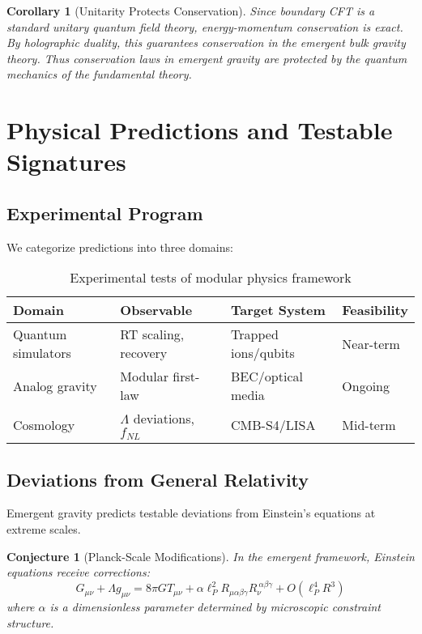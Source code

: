 \documentclass[11pt,a4paper]{article}
\newtheorem{corollary}[theorem]{Corollary}
\newtheorem{conjecture}{Conjecture}[section]
\theoremstyle{remark}
\theoremstyle{definition}
\begin{document}
\begin{corollary}[Unitarity Protects Conservation]
Since boundary CFT is a standard unitary quantum field theory, energy-momentum conservation is exact. By holographic duality, this guarantees conservation in the emergent bulk gravity theory. Thus conservation laws in emergent gravity are protected by the quantum mechanics of the fundamental theory.
\end{corollary}

\section{Physical Predictions and Testable Signatures}
\label{sec:physical_predictions}

\subsection{Experimental Program}

We categorize predictions into three domains:

\begin{table}[h]
\centering
\begin{tabular}{|l|l|l|l|}
\hline
\textbf{Domain} & \textbf{Observable} & \textbf{Target System} & \textbf{Feasibility} \\
\hline
Quantum simulators & RT scaling, recovery & Trapped ions/qubits & Near-term \\
Analog gravity & Modular first-law & BEC/optical media & Ongoing \\
Cosmology & $\Lambda$ deviations, $f_{NL}$ & CMB-S4/LISA & Mid-term \\
\hline
\end{tabular}
\caption{Experimental tests of modular physics framework}
\end{table}

\subsection{Deviations from General Relativity}

Emergent gravity predicts testable deviations from Einstein's equations at extreme scales.

\begin{conjecture}[Planck-Scale Modifications]
In the emergent framework, Einstein equations receive corrections:
\begin{equation}
G_{\mu\nu} + \Lambda g_{\mu\nu} = 8\pi G T_{\mu\nu} + \alpha \ell_P^2 R_{\mu\alpha\beta\gamma} R_\nu^{~\alpha\beta\gamma} + O(\ell_P^4 R^3)
\end{equation}
where $\alpha$ is a dimensionless parameter determined by microscopic constraint structure.
\end{conjecture}
\end{document}
